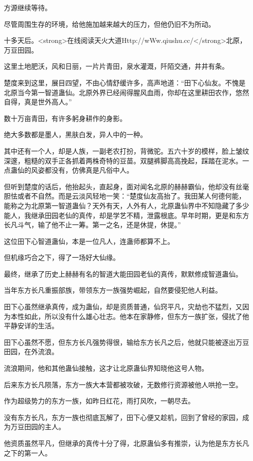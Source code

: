 \begin{this_body}
方源继续等待。

尽管周围生存的环境，给他施加越来越大的压力，但他仍旧不为所动。

十多天后。<strong>在线阅读天火大道Http://wWw.qiushu.cc/</strong>北原，万豆田园。

这里土地肥沃，风和日丽，一片片青田，泉水灌溉，阡陌交通，井井有条。

楚度来到这里，展目四望，不由心情舒缓许多，高声地道：“田下心仙友。不愧是北原当今第一智道蛊仙。北原外界已经闹得腥风血雨，你却在这里耕田农作，悠然自得，真是世外高人。”

数十万亩青田，有许多躬身耕作的身影。

绝大多数都是墨人，黑肤白发，异人中的一种。

其中还有一个人，却是人族，一副老农打扮，背微驼。五六十岁的模样，脸上皱纹深邃，粗糙的双手正各抓着两株奇特的豆苗。双腿裤脚高高挽起，踩踏在泥水。一点蛊仙的风姿都没有，仿佛真是凡俗中人。

但听到楚度的话后，他抬起头，直起身，面对闻名北原的赫赫霸仙，他却没有丝毫胆怯或者不自然。而是云淡风轻地一笑：“楚度仙友高抬了。我田某人何德何能，能称之为北原第一智道蛊仙？天外有天，人外有人，北原蛊仙界中不知隐藏了多少能人，我继承田园老仙的真传，却是学艺不精，泄露根底。早年时期，更是和东方长凡斗气，输了他不止一筹。第一之名，还是休提，休提。”

这位田下心智道蛊仙，本是一位凡人，连蛊师都算不上。

但机缘巧合之下，得了一场好大仙缘。

最终，继承了历史上赫赫有名的智道大能田园老仙的真传，默默修成智道蛊仙。

当年东方长凡重振部族，带领东方一族强势崛起，自然要侵犯他人利益。

田下心虽然继承真传，成为蛊仙，却是资质普通，仙窍平凡，灾劫也不猛烈，又因为本性如此，所以没有什么雄心壮志。他本在家静修，但东方一族扩张，侵扰了他平静安详的生活。

田下心虽然不愿，但东方长凡强势得很，输给东方长凡之后，他就只能被逐出万豆田园，在外流浪。

流浪期间，他和其他蛊仙接触，这才让北原蛊仙界知晓他这号人物。

后来东方长凡陨落，东方一族大本营都被攻破，无数修行资源被他人哄抢一空。

作为超级势力的东方一族，如昨日红花，雨打风吹，一朝尽去。

没有东方长凡，东方一族也彻底瓦解了，田下心便又趁机，回到了曾经的家园，成为万豆田园的主人。

他资质虽然平凡，但继承的真传十分了得，北原蛊仙多有推崇，认为他是东方长凡之下的第一人。


\end{this_body}
